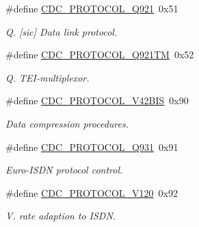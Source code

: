 \begin{DoxyCompactItemize}
\#define \hyperlink{group__cdc__protocol__group_gab4efd3c7d98b5d12bf01238259a50707}{C\+D\+C\+\_\+\+P\+R\+O\+T\+O\+C\+O\+L\+\_\+\+Q921}~0x51
\begin{DoxyCompactList}\small\item\em Q. \mbox{[}sic\mbox{]} Data link protocol. \end{DoxyCompactList}\item 
\mbox{\label{group__cdc__protocol__group_ga4a1fc0e0435a322372f24b797bdccbc6}} 
\#define \hyperlink{group__cdc__protocol__group_ga4a1fc0e0435a322372f24b797bdccbc6}{C\+D\+C\+\_\+\+P\+R\+O\+T\+O\+C\+O\+L\+\_\+\+Q921\+TM}~0x52
\begin{DoxyCompactList}\small\item\em Q. T\+E\+I-\/multiplexor. \end{DoxyCompactList}\item 
\mbox{\label{group__cdc__protocol__group_ga230095dec563e53ab1231c981ee9d05f}} 
\#define \hyperlink{group__cdc__protocol__group_ga230095dec563e53ab1231c981ee9d05f}{C\+D\+C\+\_\+\+P\+R\+O\+T\+O\+C\+O\+L\+\_\+\+V42\+B\+IS}~0x90
\begin{DoxyCompactList}\small\item\em Data compression procedures. \end{DoxyCompactList}\item 
\mbox{\label{group__cdc__protocol__group_ga0083ef9581e965b89b52d55bf315e419}} 
\#define \hyperlink{group__cdc__protocol__group_ga0083ef9581e965b89b52d55bf315e419}{C\+D\+C\+\_\+\+P\+R\+O\+T\+O\+C\+O\+L\+\_\+\+Q931}~0x91
\begin{DoxyCompactList}\small\item\em Euro-\/\+I\+S\+DN protocol control. \end{DoxyCompactList}\item 
\mbox{\label{group__cdc__protocol__group_ga208090ddb75268f1f49e8e815400b6e3}} 
\#define \hyperlink{group__cdc__protocol__group_ga208090ddb75268f1f49e8e815400b6e3}{C\+D\+C\+\_\+\+P\+R\+O\+T\+O\+C\+O\+L\+\_\+\+V120}~0x92
\begin{DoxyCompactList}\small\item\em V. rate adaption to I\+S\+DN. \end{DoxyCompactList}\item 

\end{DoxyCompactItemize}
